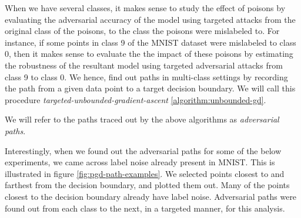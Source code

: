 \documentclass[12pt, oneside]{book}
\begin{document}
When we have several classes, it makes sense to study the effect of poisons by
evaluating the adversarial accuracy of the model using targeted attacks from the
original class of the poisons, to the class the poisons were mislabeled to. For
instance, if some points in class 9 of the MNIST dataset were mislabeled to
class 0, then it makes sense to evaluate the the impact of these poisons by
estimating the robustness of the resultant model using targeted adversarial
attacks from class 9 to class 0. We hence, find out paths in multi-class
settings by recording the path from a given data point to a target decision
boundary. We will call this procedure \emph{targeted-unbounded-gradient-ascent}
\ref{algorithm:unbounded-gd}.

We will refer to the paths traced out by the above algorithms as
\emph{adversarial paths}.

Interestingly, when we found out the adversarial paths for some of the below
experiments, we came across label noise already present in MNIST. This is
illustrated in figure \ref{fig:pgd-path-examples}. We selected points closest to
and farthest from the decision boundary, and plotted them out. Many of the
points closest to the decision boundary already have label noise. Adversarial
paths were found out from each class to the next, in a targeted manner, for this
analysis.
\end{document}
